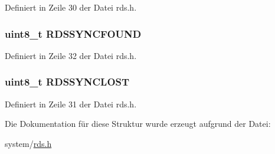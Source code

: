 Definiert in Zeile 30 der Datei rds.\+h.

\hypertarget{structinfo_a924e0044d60c0d490d165ceb3ef6b23d}{}
\subsubsection[{R\+D\+S\+S\+Y\+N\+C\+F\+O\+U\+N\+D}]{\setlength{\rightskip}{0pt plus 5cm}uint8\+\_\+t R\+D\+S\+S\+Y\+N\+C\+F\+O\+U\+N\+D}\label{structinfo_a924e0044d60c0d490d165ceb3ef6b23d}


Definiert in Zeile 32 der Datei rds.\+h.

\hypertarget{structinfo_a73c3d34273c45dd08fcb341496c08052}{}
\subsubsection[{R\+D\+S\+S\+Y\+N\+C\+L\+O\+S\+T}]{\setlength{\rightskip}{0pt plus 5cm}uint8\+\_\+t R\+D\+S\+S\+Y\+N\+C\+L\+O\+S\+T}\label{structinfo_a73c3d34273c45dd08fcb341496c08052}


Definiert in Zeile 31 der Datei rds.\+h.



Die Dokumentation für diese Struktur wurde erzeugt aufgrund der Datei\+:\begin{DoxyCompactItemize}
\item 
system/\hyperlink{rds_8h}{rds.\+h}\end{DoxyCompactItemize}
